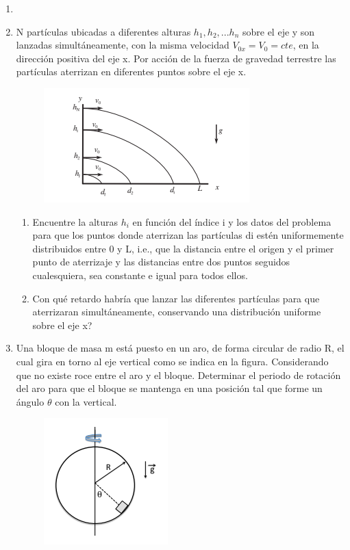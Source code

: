 \documentclass[letterpaper,11pt]{article}
\begin{document}
\vspace{-1cm}
\begin{enumerate}\setlength{\itemsep}{0.4cm}


\item[]

\item N partículas ubicadas a diferentes alturas $h_1, h_2, . . . h_n$ sobre el eje y son lanzadas simultáneamente, con la misma velocidad $V_{0x}=V_0=cte$, en la dirección positiva del eje x. Por acción de la fuerza de gravedad terrestre las partículas aterrizan en diferentes puntos sobre el eje x.
\begin{figure}[h!]
    \centering
    \includegraphics[scale=0.4]{2021-1/Imagenes/Aux extra/Captura de Pantalla 2021-05-04 a la(s) 16.54.42.png}
\end{figure}

\begin{enumerate}
    \item Encuentre la alturas $h_i$ en función del  índice i y los datos del problema para que los puntos donde aterrizan las partículas di estén uniformemente distribuidos entre 0 y L, i.e., que la distancia entre el origen y el primer punto de aterrizaje y las distancias entre dos puntos seguidos cualesquiera, sea constante e igual para todos ellos.
    \item Con qué retardo habría que lanzar las diferentes partículas para que aterrizaran simultáneamente, conservando una distribución uniforme sobre el eje x?
\end{enumerate}

\item Una bloque de masa m está puesto en un aro, de forma circular de radio R, el cual gira en torno al eje vertical como se indica en la figura. Considerando que no existe roce entre el aro y el bloque. Determinar el periodo de rotación del aro
para que el bloque se mantenga en una posición tal que forme un ángulo $\theta$ con la vertical.
\begin{figure}[h!]
    \centering
    \includegraphics[scale=0.4]{2021-1/Imagenes/Aux extra/Captura de Pantalla 2021-05-04 a la(s) 16.49.26.png}
\end{figure}


\end{enumerate}
\end{document}
